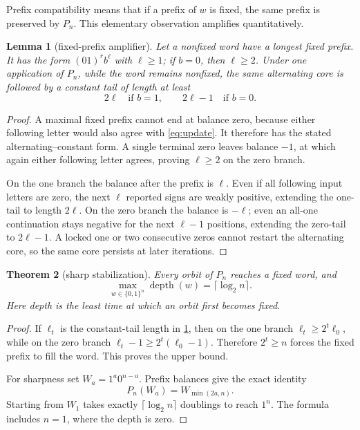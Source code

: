 \documentclass[10pt,a4paper]{amsart}
\newtheorem{theorem}{Theorem}[section]
\newtheorem{lemma}[theorem]{Lemma}
\theoremstyle{definition}
\theoremstyle{remark}
\newcommand{\depth}{\operatorname{depth}}
\begin{document}
Prefix compatibility means that if a prefix of $w$ is fixed, the same prefix
is preserved by $P_n$.  This elementary observation amplifies quantitatively.

\begin{lemma}[fixed-prefix amplifier]\label{lem:amplifier}
Let a nonfixed word have a longest fixed prefix.  It has the form
$(01)^r b^\ell$ with $\ell\ge1$; if $b=0$, then $\ell\ge2$.  Under one
application of $P_n$, while the word remains nonfixed, the same alternating
core is followed by a constant tail of length at least
\begin{equation}
 2\ell\quad\text{if }b=1,
 \qquad 2\ell-1\quad\text{if }b=0.                     \label{eq:amplify}
\end{equation}
\end{lemma}

\begin{proof}
A maximal fixed prefix cannot end at balance zero, because either following
letter would also agree with \eqref{eq:update}.  It therefore has the stated
alternating--constant form.  A single terminal zero leaves balance $-1$, at
which again either following letter agrees, proving $\ell\ge2$ on the zero
branch.

On the one branch the balance after the prefix is $\ell$.  Even if all
following input letters are zero, the next $\ell$ reported signs are weakly
positive, extending the one-tail to length $2\ell$.  On the zero branch the
balance is $-\ell$; even an all-one continuation stays negative for the next
$\ell-1$ positions, extending the zero-tail to $2\ell-1$.  A locked one or
two consecutive zeros cannot restart the alternating core, so the same core
persists at later iterations.
\end{proof}

\begin{theorem}[sharp stabilization]\label{thm:clock}
Every orbit of $P_n$ reaches a fixed word, and
\begin{equation}
 \max_{w\in\{0,1\}^n}\depth(w)=\lceil\log_2 n\rceil.   \label{eq:clock}
\end{equation}
Here depth is the least time at which an orbit first becomes fixed.
\end{theorem}

\begin{proof}
If $\ell_t$ is the constant-tail length in \cref{lem:amplifier}, then on the
one branch $\ell_t\ge2^t\ell_0$, while on the zero branch
$\ell_t-1\ge2^t(\ell_0-1)$.  Therefore $2^t\ge n$ forces the fixed prefix to
fill the word.  This proves the upper bound.

For sharpness set $W_a=1^a0^{n-a}$.  Prefix balances give the exact identity
\begin{equation}
 P_n(W_a)=W_{\min(2a,n)}.                               \label{eq:witness}
\end{equation}
Starting from $W_1$ takes exactly $\lceil\log_2n\rceil$ doublings to reach
$1^n$.  The formula includes $n=1$, where the depth is zero.
\end{proof}
\end{document}
